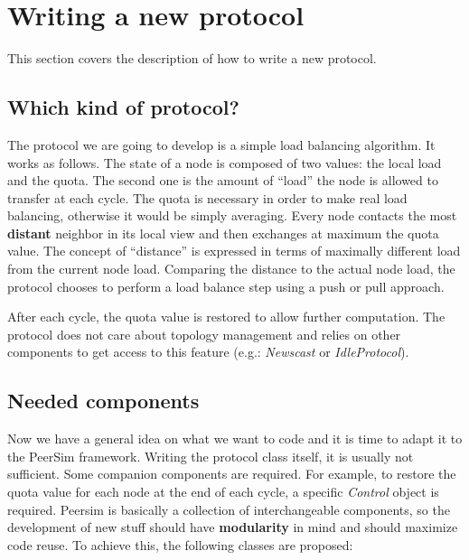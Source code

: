 \documentclass[a4paper,11pt]{article}
\begin{document}
\section{Writing a new protocol}


This section covers the description of how to write a new protocol. 


\subsection{Which kind of protocol?}

The protocol we are going to develop is a simple load balancing algorithm.
It works as follows. The state of a node is composed of two values:
the local load and the quota. The second one is the amount of ``load''
the node is allowed to transfer at each cycle. The quota is necessary
in order to make real load balancing, otherwise it would be simply
averaging. Every node contacts the most \textbf{distant} neighbor
in its local view and then exchanges at maximum the quota value. The
concept of ``distance'' is expressed in terms of maximally
different load from the current node load. Comparing the distance
to the actual node load, the protocol chooses to perform a load balance
step using a push or pull approach.

After each cycle, the quota value is restored to allow further computation.
The protocol does not care about topology management and relies on
other components to get access to this feature (e.g.: \emph{Newscast} or
\emph{IdleProtocol}). 


\subsection{Needed components}

Now we have a general idea on what we want to code and it is time to
adapt it to the PeerSim framework. Writing the protocol class itself,
it is usually not sufficient. Some companion components are required.
For example, to restore the quota value for each node at the end of
each cycle, a specific \emph{Control} object is required. Peersim
is basically a collection of interchangeable components, so the development
of new stuff should have \textbf{modularity} in mind and should maximize
code reuse. To achieve this, the following classes are proposed:
\end{document}
